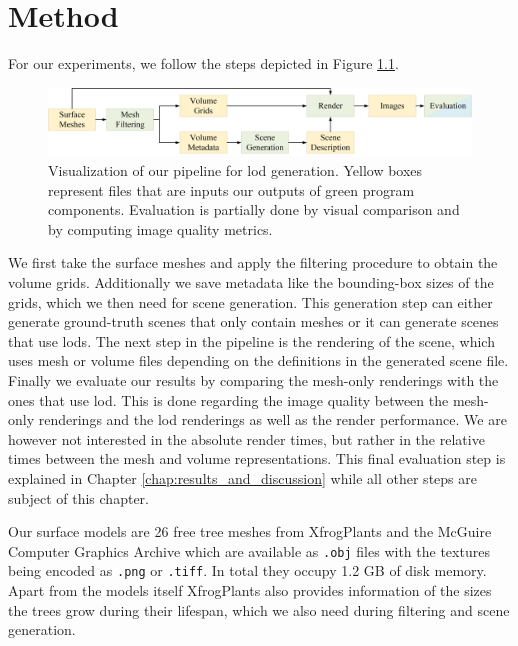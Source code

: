\chapter{Method}
\label{chap:method}
For our experiments, we follow the steps depicted in Figure \ref{fig:pipeline}.
\begin{figure}[ht]
    \centering
    \includegraphics[width=1.0\linewidth]{img/pipeline.png}
    \caption[Visualization of the pipeline the thesis built upon]{Visualization of our pipeline for \ac{lod} generation. Yellow boxes represent files that are inputs our outputs of green program components. Evaluation is partially done by visual comparison and by computing image quality metrics.}
    \label{fig:pipeline}
\end{figure}
We first take the surface meshes and apply the filtering procedure to obtain the volume grids.
Additionally we save metadata like the bounding-box sizes of the grids, which we then need for scene generation.
This generation step can either generate ground-truth scenes that only contain meshes or it can generate scenes that use \acp{lod}.
The next step in the pipeline is the rendering of the scene, which uses mesh or volume files depending on the definitions in the generated scene file.
Finally we evaluate our results by comparing the mesh-only renderings with the ones that use \ac{lod}.
This is done regarding the image quality between the mesh-only renderings and the \ac{lod} renderings as well as the render performance.
We are however not interested in the absolute render times, but rather in the relative times between the mesh and volume representations.
This final evaluation step is explained in Chapter \ref{chap:results_and_discussion} while all other steps are subject of this chapter.

Our surface models are 26 free tree meshes from XfrogPlants \cite{xfrogplants} and the McGuire Computer Graphics Archive \cite{McGuire2017Data} which are available as \texttt{.obj} files with the textures being encoded as \texttt{.png} or \texttt{.tiff}.
In total they occupy 1.2 GB of disk memory.
Apart from the models itself XfrogPlants also provides information of the sizes the trees grow during their lifespan, which we also need during filtering and scene generation.

